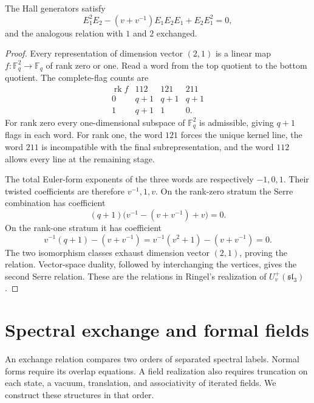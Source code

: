 \begin{theorem}
The Hall generators satisfy
\[
 E_1^2E_2-(v+v^{-1})E_1E_2E_1+E_2E_1^2=0,
\]
and the analogous relation with $1$ and $2$ exchanged.
\end{theorem}
\begin{proof}
Every representation of dimension vector $(2,1)$ is a linear map $f:\mathbb F_q^2\to\mathbb F_q$ of rank zero or one. Read a word from the top quotient to the bottom quotient. The complete-flag counts are
\[
\begin{array}{c|ccc}
\operatorname{rk}f&112&121&211\\ \hline
0&q+1&q+1&q+1\\
1&q+1&1&0.
\end{array}
\]
For rank zero every one-dimensional subspace of $\mathbb F_q^2$ is admissible, giving $q+1$ flags in each word. For rank one, the word $121$ forces the unique kernel line, the word $211$ is incompatible with the final subrepresentation, and the word $112$ allows every line at the remaining stage.

The total Euler-form exponents of the three words are respectively $-1,0,1$. Their twisted coefficients are therefore $v^{-1},1,v$. On the rank-zero stratum the Serre combination has coefficient
\[
 (q+1)\bigl(v^{-1}-(v+v^{-1})+v\bigr)=0.
\]
On the rank-one stratum it has coefficient
\[
 v^{-1}(q+1)-(v+v^{-1})
 =v^{-1}(v^2+1)-(v+v^{-1})=0.
\]
The two isomorphism classes exhaust dimension vector $(2,1)$, proving the relation. Vector-space duality, followed by interchanging the vertices, gives the second Serre relation. These are the relations in Ringel's realization of $U_v^+(\mathfrak{sl}_3)$ \cite{Ringel,Green}.
\end{proof}

\chapter{Spectral exchange and formal fields}

An exchange relation compares two orders of separated spectral labels.
Normal forms require its overlap equations. A field realization also requires
truncation on each state, a vacuum, translation, and associativity of iterated fields.
We construct these structures in that order.

